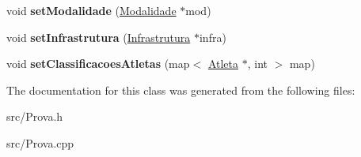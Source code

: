 \begin{DoxyCompactItemize}
\item 
\hypertarget{class_prova_af264957eb89840e0c50ba9d1715efa08}{}void {\bfseries set\+Modalidade} (\hyperlink{class_modalidade}{Modalidade} $\ast$mod)\label{class_prova_af264957eb89840e0c50ba9d1715efa08}

\item 
\hypertarget{class_prova_a24499b4bd41c7e72098325e984d20a86}{}void {\bfseries set\+Infrastrutura} (\hyperlink{class_infrastrutura}{Infrastrutura} $\ast$infra)\label{class_prova_a24499b4bd41c7e72098325e984d20a86}

\item 
\hypertarget{class_prova_ae2b612d5e23720e7ce7d48d7fba7db63}{}void {\bfseries set\+Classificacoes\+Atletas} (map$<$ \hyperlink{class_atleta}{Atleta} $\ast$, int $>$ map)\label{class_prova_ae2b612d5e23720e7ce7d48d7fba7db63}

\end{DoxyCompactItemize}


The documentation for this class was generated from the following files\+:\begin{DoxyCompactItemize}
\item 
src/Prova.\+h\item 
src/Prova.\+cpp\end{DoxyCompactItemize}

